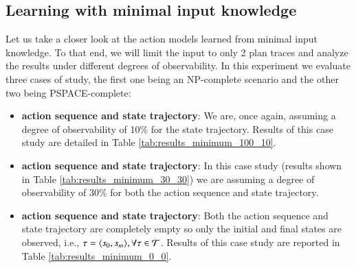

\subsection{Learning with minimal input knowledge}
\label{minimal}
Let us take a closer look at the action models learned from minimal input knowledge. To that end, we will limit the input to only 2 plan traces and analyze the results under different degrees of observability. In this experiment we evaluate three cases of study, the first one being an NP-complete scenario and the other two being PSPACE-complete:
\begin{itemize}
	\item \textbf{\FO action sequence and \PO state trajectory}: We are, once again, assuming a degree of observability of 10\% for the state trajectory. Results of this case study are detailed in Table \ref{tab:results_minimum_100_10}.
	\item  \textbf{\PO action sequence and \PO state trajectory}: In this case study (results shown in Table \ref{tab:results_minimum_30_30}) we are assuming a degree of observability of 30\% for both the action sequence and state trajectory.
	\item  \textbf{\NO action sequence and \NO state trajectory}: Both the action sequence and state trajectory are completely empty so only the initial and final states are observed, i.e., $\tau = {\langle s_0, s_m \rangle}, \forall \tau \in \mathcal{T}$. Results of this case study are reported in Table \ref{tab:results_minimum_0_0}.
\end{itemize}


